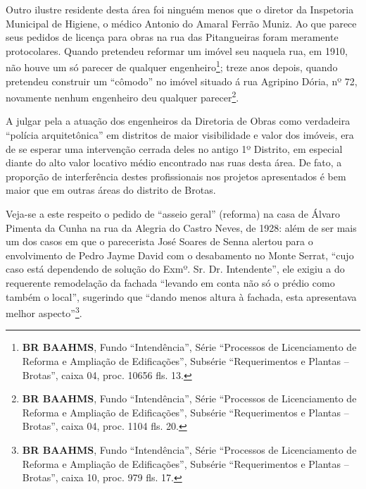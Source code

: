 Outro ilustre residente desta área foi ninguém menos que o diretor da Inspetoria Municipal de Higiene, o médico Antonio do Amaral Ferrão Muniz. Ao que parece seus pedidos de licença para obras na rua das Pitangueiras foram meramente protocolares. Quando pretendeu reformar um imóvel seu naquela rua, em 1910, não houve um só parecer de qualquer engenheiro\footnote{\textbf{BR BAAHMS}, Fundo ``Intendência'', Série ``Processos de Licenciamento de Reforma e Ampliação de Edificações'', Subsérie ``Requerimentos e Plantas -- Brotas'', caixa 04, proc. 10656 fls. 13.}; treze anos depois, quando pretendeu construir um ``cômodo'' no imóvel situado á rua Agripino Dória, nº 72, novamente nenhum engenheiro deu qualquer parecer\footnote{\textbf{BR BAAHMS}, Fundo ``Intendência'', Série ``Processos de Licenciamento de Reforma e Ampliação de Edificações'', Subsérie ``Requerimentos e Plantas -- Brotas'', caixa 04, proc. 1104 fls. 20.}.


A julgar pela a atuação dos engenheiros da Diretoria de Obras como verdadeira ``polícia arquitetônica'' em distritos de maior visibilidade e valor dos imóveis\cite{almeida_victoria_1997, almeida_vitrinescomercio_2014}, era de se esperar uma intervenção cerrada deles no antigo 1º Distrito, em especial diante do alto valor locativo médio encontrado nas ruas desta área. De fato, a proporção de interferência destes profissionais nos projetos apresentados é bem maior que em outras áreas do distrito de Brotas.

Veja-se a este respeito o pedido de ``asseio geral'' (reforma) na casa de Álvaro Pimenta da Cunha na rua da Alegria do Castro Neves, de 1928: além de ser mais um dos casos em que o parecerista José Soares de Senna alertou para o envolvimento de Pedro Jayme David com o desabamento no Monte Serrat, ``cujo caso está dependendo de solução do Exmº. Sr. Dr. Intendente'', ele exigiu a do requerente remodelação da fachada ``levando em conta não só o prédio como também o local'', sugerindo que ``dando menos altura à fachada, esta apresentava melhor aspecto''\footnote{\textbf{BR BAAHMS}, Fundo ``Intendência'', Série ``Processos de Licenciamento de Reforma e Ampliação de Edificações'', Subsérie ``Requerimentos e Plantas – Brotas'', caixa 10, proc. 979 fls. 17.}.

